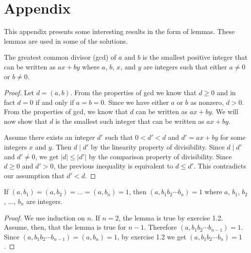\appendix
\chapter{Appendix}

This appendix presents some interesting results in the form of lemmas.
These lemmas are used in some of the solutions.


\begin{lemma}
  \label{ap-gcd-smallest}
  The greatest common divisor (gcd) of \( a \) and \( b \) is the
  smallest positive integer that can be written as \( ax + by \) where
  \( a \), \( b \), \( x \), and \( y \) are integers such that either
  \( a \ne 0 \) or \( b \ne 0 \).
\end{lemma}

\begin{proof}
  Let \( d = (a, b) \). From the properties of gcd we know that \( d
  \ge 0 \) and in fact \( d = 0 \) if and only if \( a = b = 0 \).
  Since we have either \( a \) or \( b \) as nonzero, \( d > 0 \).
  From the properties of gcd, we know that \( d \) can be written as
  \( ax + by \). We will now show that \( d \) is the smallest such
  integer that can be written as \( ax + by \).

  Assume there exists an integer \( d' \) such that \( 0 < d' < d \)
  and \( d' = ax + by \) for some integers \( x \) and \( y \). Then
  \( d \mid d' \) by the linearity property of divisibility. Since \(
  d \mid d' \) and \( d' \ne 0 \), we get \( \lvert d \rvert \le
  \lvert d' \rvert \) by the comparison property of divisibility.
  Since \( d \ge 0 \) and \( d' > 0 \), the previous inequality is
  equivalent to \( d \le d' \). This contradicts our assumption that
  \( d' < d \).
\end{proof}


\begin{lemma}
  \label{ap-multi-coprime}
  If \( (a, b_1) = (a, b_2) = \dots = (a, b_n) = 1 \), then \( (a, b_1
  b_2 \cdots b_n) = 1 \) where \( a \), \( b_1 \), \( b_2 \), \( \dots
  \), \( b_n \) are integers.
\end{lemma}

\begin{proof}
  We use induction on \( n \). If \( n = 2 \), the lemma is true by
  exercise 1.2. Assume, then, that the lemma is true for \( n - 1 \).
  Therefore \( (a, b_1 b_2 \cdots b_{n - 1}) = 1 \). Since \( (a, b_1 b_2
  \cdots b_{n - 1}) = (a, b_n) = 1 \), by exercise 1.2 we get \( (a,
  b_1 b_2 \cdots b_n ) = 1 \).
\end{proof}


